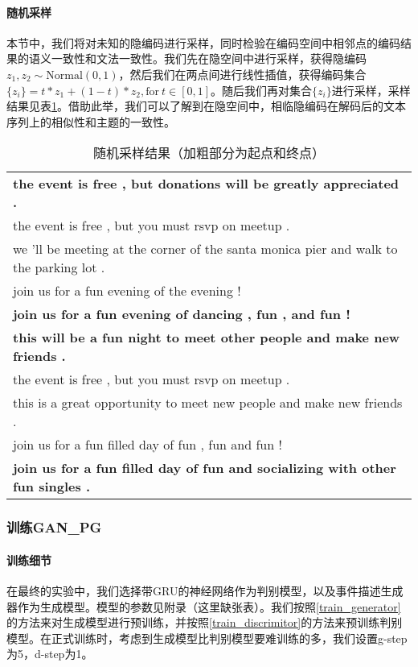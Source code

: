 \documentclass[]{template}
\begin{document}
\paragraph{随机采样}
本节中，我们将对未知的隐编码进行采样，同时检验在编码空间中相邻点的编码结果的语义一致性和文法一致性。我们先在隐空间中进行采样，获得隐编码$z_1,z_2 \sim \mathrm{Normal}(0,1)$，然后我们在两点间进行线性插值，获得编码集合$\{z_i\} = t*z_1+(1-t)*z_2 ,\mathrm{for}\ t \in [0,1]$。随后我们再对集合$\{z_i\}$进行采样，采样结果见表\ref{t3-3}。借助此举，我们可以了解到在隐空间中，相临隐编码在解码后的文本序列上的相似性和主题的一致性。 

\begin{table}[htbp]
    \center
    \caption{\label{t3-3}随机采样结果（加粗部分为起点和终点）}
    \begin{tabular*}{\linewidth}{p{\linewidth}}
\toprule
\textbf{the event is free , but donations will be greatly appreciated .}\\
the event is free , but you must rsvp on meetup . \\
we 'll be meeting at the corner of the santa monica pier and walk to the parking lot .\\
join us for a fun evening of the evening !\\
\textbf{join us for a fun evening of dancing , fun , and fun !}\\
\midrule
\textbf{this will be a fun night to meet other people and make new friends .}\\
the event is free , but you must rsvp on meetup . \\
this is a great opportunity to meet new people and make new friends .\\
join us for a fun filled day of fun , fun and fun ! \\
\textbf{join us for a fun filled day of fun and socializing with other fun singles . }\\
\bottomrule
    \end{tabular*}
\end{table}

\subsubsection{训练GAN\_PG}
\paragraph{训练细节}
在最终的实验中，我们选择带GRU的神经网络作为判别模型，以及事件描述生成器作为生成模型。模型的参数见附录（这里缺张表）。我们按照\ref{train_generator}的方法来对生成模型进行预训练，并按照\ref{train_discrimitor}的方法来预训练判别模型。在正式训练时，考虑到生成模型比判别模型要难训练的多，我们设置g-step为5，d-step为1。
\end{document}
